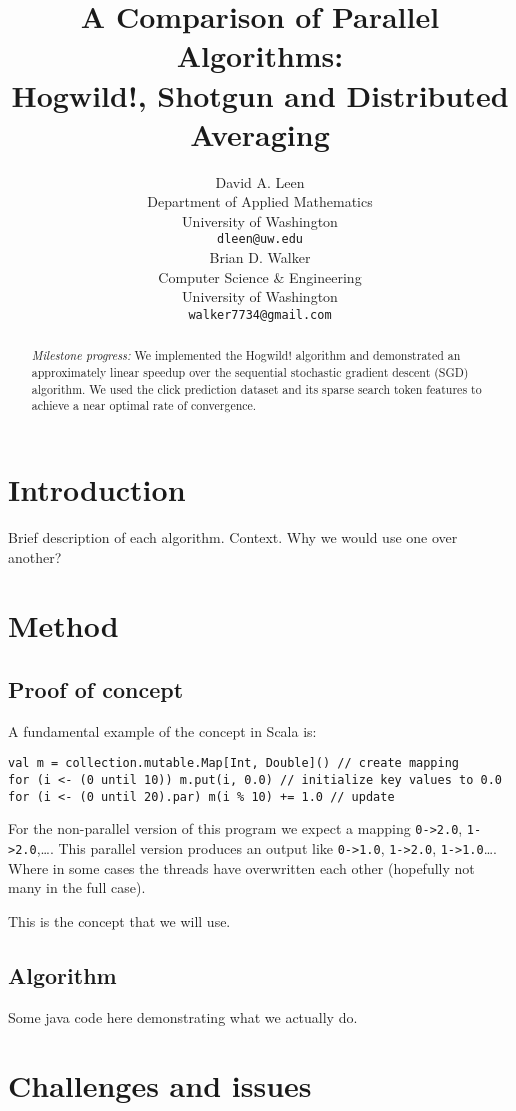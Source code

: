 \documentclass{article} %
\title{A Comparison of Parallel Algorithms:\\ {\Large Hogwild!, Shotgun and Distributed Averaging}}
\author{
David A. Leen \\
Department of Applied Mathematics\\
University of Washington \\
\texttt{dleen@uw.edu} \\
\And
Brian D. Walker \\
Computer Science \& Engineering \\
University of Washington \\
\texttt{walker7734@gmail.com} \\
}
\begin{document}
\maketitle

\begin{abstract}
{\em Milestone progress:} We implemented the Hogwild! algorithm and demonstrated an approximately linear speedup over the 
sequential stochastic gradient descent (SGD) algorithm.  We used the click prediction dataset and its sparse search token features to achieve a near optimal rate of convergence.
\end{abstract}

\section{Introduction}
Brief description of each algorithm. Context. Why we would use one over another? 

\section{Method}

\subsection{Proof of concept}
A fundamental example of the concept in Scala is:
\begin{lstlisting}
val m = collection.mutable.Map[Int, Double]() // create mapping
for (i <- (0 until 10)) m.put(i, 0.0) // initialize key values to 0.0
for (i <- (0 until 20).par) m(i % 10) += 1.0 // update 
\end{lstlisting}
For the non-parallel version of this program we expect a mapping  \verb+0->2.0+, \verb+1->2.0+,\ldots. This parallel version produces an output like \verb+0->1.0+, \verb+1->2.0+, \verb+1->1.0+\ldots. Where in some cases the threads have overwritten each other (hopefully not many in the full case).

This is the concept that we will use.

\subsection{Algorithm}
Some java code here demonstrating what we actually do.


\section{Challenges and issues}
\label{gen_inst}
\end{document}
